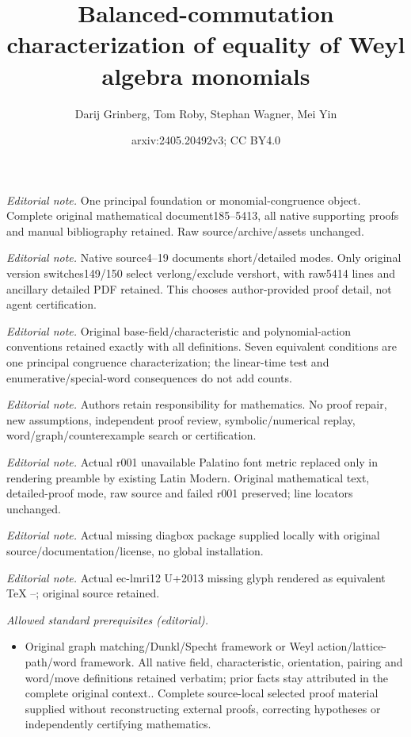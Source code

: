 \documentclass[numbers=enddot,12pt,final,onecolumn,notitlepage]{scrartcl}%
\title{Balanced-commutation characterization of equality of Weyl algebra monomials}
\author{Darij Grinberg, Tom Roby, Stephan Wagner, Mei Yin}
\date{arxiv:2405.20492v3; CC BY4.0}
\theoremstyle{definition}
\begin{document}
\maketitle
\noindent\textit{Editorial note.} One principal foundation or monomial-congruence object. Complete original mathematical document185--5413, all native supporting proofs and manual bibliography retained. Raw source/archive/assets unchanged.\par\medskip
\noindent\textit{Editorial note.} Native source4--19 documents short/detailed modes. Only original version switches149/150 select verlong/exclude vershort, with raw5414 lines and ancillary detailed PDF retained. This chooses author-provided proof detail, not agent certification.\par\medskip
\noindent\textit{Editorial note.} Original base-field/characteristic and polynomial-action conventions retained exactly with all definitions. Seven equivalent conditions are one principal congruence characterization; the linear-time test and enumerative/special-word consequences do not add counts.\par\medskip
\noindent\textit{Editorial note.} Authors retain responsibility for mathematics. No proof repair, new assumptions, independent proof review, symbolic/numerical replay, word/graph/counterexample search or certification.\par\medskip
\noindent\textit{Editorial note.} Actual r001 unavailable Palatino font metric replaced only in rendering preamble by existing Latin Modern. Original mathematical text, detailed-proof mode, raw source and failed r001 preserved; line locators unchanged.\par\medskip
\noindent\textit{Editorial note.}  Actual missing diagbox package supplied locally with original source/documentation/license, no global installation.\par\medskip
\noindent\textit{Editorial note.} Actual ec-lmri12 U+2013 missing glyph rendered as equivalent TeX --; original source retained.\par\medskip
\noindent\textit{Allowed standard prerequisites (editorial).}\begin{itemize}
\item Original graph matching/Dunkl/Specht framework or Weyl action/lattice-path/word framework. All native field, characteristic, orientation, pairing and word/move definitions retained verbatim; prior facts stay attributed in the complete original context.. Complete source-local selected proof material supplied without reconstructing external proofs, correcting hypotheses or independently certifying mathematics.
\end{itemize}\medskip
\end{document}
